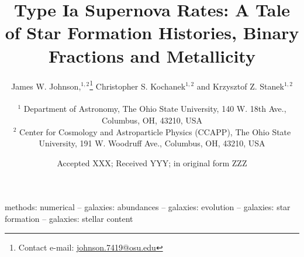 \documentclass[fleqn, usenatbib]{mnras}
\title[Type Ia Supernova Rates]{Type Ia Supernova Rates: A Tale of Star
Formation Histories, Binary Fractions and Metallicity}
\author[J.W. Johnson, C.S. Kochanek \& K.Z. Stanek]{
	James W. Johnson,$^{1, 2}$\thanks{
		Contact e-mail: \href{mailto:johnson.7419@osu.edu}{johnson.7419@osu.edu}
	}
	Christopher S. Kochanek$^{1, 2}$ and
	Krzysztof Z. Stanek$^{1, 2}$
	\\ \null \\
	$^{1}$ Department of Astronomy, The Ohio State University,
	140 W. 18th Ave., Columbus, OH, 43210, USA
	\\
	$^{2}$ Center for Cosmology and Astroparticle Physics (CCAPP),
	The Ohio State University, 191 W. Woodruff Ave., Columbus, OH, 43210, USA
}
\date{Accepted XXX; Received YYY; in original form ZZZ}
\begin{document}
\label{firstpage}
\pagerange{\pageref{firstpage}--\pageref{lastpage}}
\maketitle

\begin{keywords}
methods: numerical -- galaxies: abundances -- galaxies: evolution --
galaxies: star formation -- galaxies: stellar content
\end{keywords}









\label{lastpage}
\end{document}
